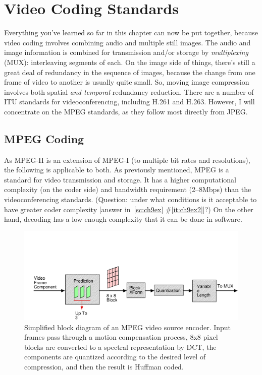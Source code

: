\section{Video Coding Standards}

Everything you've learned so far in this chapter can now be put
together, because video coding involves combining audio and multiple
still images.  The audio and image information is combined for
transmission and/or storage by \emph{multiplexing} (MUX): interleaving
segments of each.  On the image side of things, there's still a great
deal of redundancy in the sequence of images, because the change from
one frame of video to another is usually quite small. So, moving image
compression involves both spatial \emph{and temporal} redundancy
reduction.  There are a number of ITU standards for videoconferencing,
including H.261 and H.263. However, I will concentrate on the MPEG
standards, as they follow most directly from JPEG.

\subsection{MPEG Coding}

As MPEG-II is an extension of MPEG-I (to multiple bit rates and
resolutions), the following is applicable to both. As previously
mentioned, MPEG is a standard for video transmission and storage. It
has a higher computational complexity (on the coder side) and
bandwidth requirement (2--8Mbps) than the videoconferencing
standards. (Question: under what conditions is it acceptable to have
greater coder complexity [answer in~\ref{sc:ch9ex}
\#\ref{it:ch9ex2}]?) On the other hand, decoding has a low enough
complexity that it can be done in software.

\begin{figure}
\centerline{\includegraphics[width=\textwidth]{ch-av/fig9-6}}
\caption[Simplified block diagram of an MPEG video source 
encoder]{Simplified block diagram of an MPEG video source
encoder. Input frames pass through a motion compensation process, 8x8
pixel blocks are converted to a spectral representation by DCT, the
components are quantized according to the desired level of
compression, and then the result is Huffman coded.\label{fg:mpeg}}
\end{figure}

